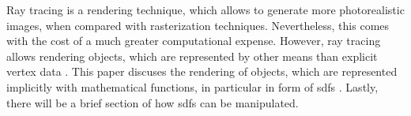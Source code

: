

Ray tracing is a rendering technique, which allows to generate more photorealistic images, when compared with rasterization techniques. Nevertheless, this comes with the cost of a much greater computational expense. However, ray tracing allows rendering objects, which are represented by other means than explicit vertex data \cite{bungartz:2013:einfuhrung}. This paper discuses the rendering of objects, which are represented implicitly with mathematical functions, in particular in form of \glspl{sdf} \cite{osher:2006:level}. Lastly, there will be a brief section of how \glspl{sdf} can be manipulated.

